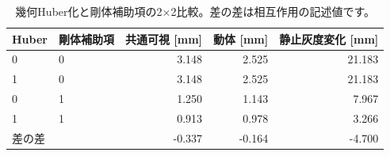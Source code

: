\begin{table}[H]\centering
\small
\setlength{\tabcolsep}{4pt}
\caption{幾何Huber化と剛体補助項の2×2比較。差の差は相互作用の記述値です。}
\begin{tabular}{llrrr}
\toprule
Huber & 剛体補助項 & 共通可視 [mm] & 動体 [mm] & 静止灰度変化 [mm]\\\midrule
0 & 0 & 3.148 & 2.525 & 21.183\\
1 & 0 & 3.148 & 2.525 & 21.183\\
0 & 1 & 1.250 & 1.143 & 7.967\\
1 & 1 & 0.913 & 0.978 & 3.266\\
差の差 &  & -0.337 & -0.164 & -4.700\\
\bottomrule
\end{tabular}
\end{table}
